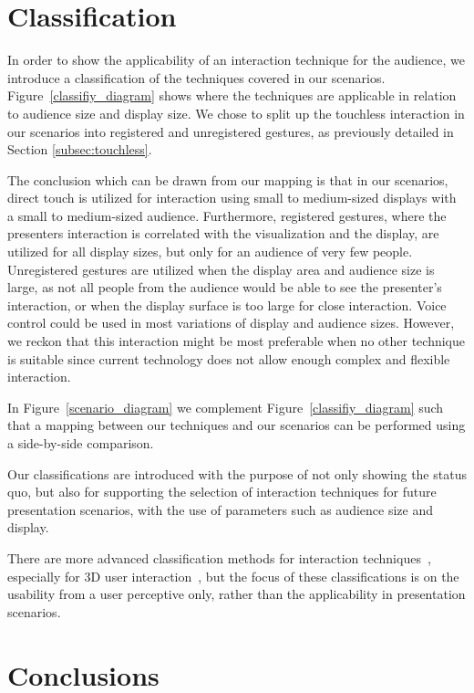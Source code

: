 \documentclass[journal]{vgtc}                %
\begin{document}
\section{Classification} \label{sec:classification}

In order to show the applicability of an interaction technique for the audience, we introduce a classification of the techniques covered in our scenarios.
Figure~\ref{classifiy_diagram} shows where the techniques are applicable in relation to audience size and display size. 
We chose to split up the touchless interaction in our scenarios into registered and unregistered gestures, as previously detailed in Section \ref{subsec:touchless}.

The conclusion which can be drawn from our mapping is that in our scenarios, direct touch is utilized for interaction using small to medium-sized displays with a small to medium-sized audience. 
Furthermore, registered gestures, where the presenters interaction is correlated with the visualization and the display, are utilized for all display sizes, but only for an audience of very few people.
Unregistered gestures are utilized when the display area and audience size is large, as not all people from the audience would be able to see the presenter's interaction, or when the display surface is too large for close interaction.
Voice control could be used in most variations of display and audience sizes. However, we reckon that this interaction might be most preferable when no other technique is suitable since current technology does not allow enough complex and flexible interaction.

In Figure~\ref{scenario_diagram} we complement Figure~\ref{classifiy_diagram} such that a mapping between our techniques and our scenarios can 
be performed using a side-by-side comparison.

Our classifications are introduced with the purpose of not only showing the status quo, but also for supporting the selection of interaction techniques for future presentation scenarios, with the use of parameters such as audience size and display.

There are more advanced classification methods for interaction techniques~\cite{stars:65-93:2012}, especially for 3D user interaction~\cite{978-3-319-07458-0_1, CGF:CGF194, Kettner95aclassification}, but the focus of these classifications is on the usability from a user perceptive only, rather than the applicability in presentation scenarios.

\section{Conclusions}\label{sec:conclusion}
\end{document}
